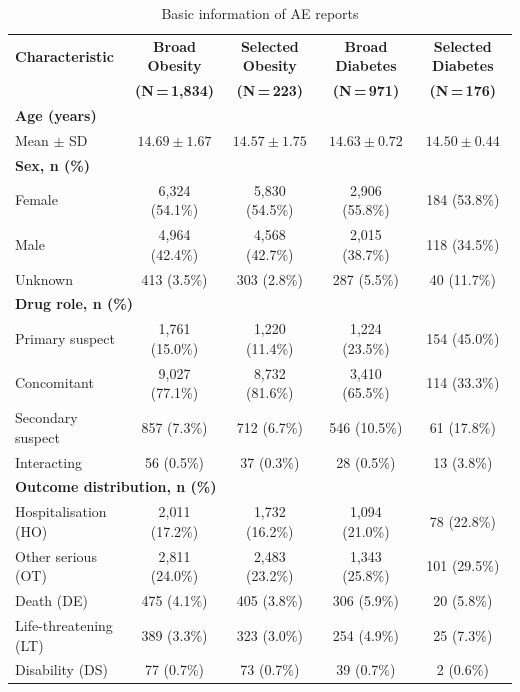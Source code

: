 \documentclass[10pt,a4paper]{article}
\begin{document}
\begin{table}[htbp]
\caption{Basic information of AE reports}
\label{tab:demographics}

\centering\footnotesize\setlength{\tabcolsep}{3.5pt}
\begin{tabular}{|l|c|c|c|c|}
\hline
\textbf{Characteristic} & \textbf{Broad Obesity} & \textbf{Selected Obesity} & \textbf{Broad Diabetes} & \textbf{Selected Diabetes} \\
 & \textbf{(N\,=\,1,834)} & \textbf{(N\,=\,223)} & \textbf{(N\,=\,971)} & \textbf{(N\,=\,176)} \\
\hline
\multicolumn{5}{|l|}{\textbf{Age (years)}} \\
\hline
\quad Mean $\pm$ SD & $14.69 \pm 1.67$ & $14.57 \pm 1.75$ & $14.63 \pm 0.72$ & $14.50 \pm 0.44$ \\
\hline
\multicolumn{5}{|l|}{\textbf{Sex, n (\%)}} \\
\hline
\quad Female & 6,324 (54.1\%) & 5,830 (54.5\%) & 2,906 (55.8\%) & 184 (53.8\%) \\
\quad Male & 4,964 (42.4\%) & 4,568 (42.7\%) & 2,015 (38.7\%) & 118 (34.5\%) \\
\quad Unknown & 413 (3.5\%) & 303 (2.8\%) & 287 (5.5\%) & 40 (11.7\%) \\
\hline
\multicolumn{5}{|l|}{\textbf{Drug role, n (\%)}} \\
\hline
\quad Primary suspect & 1,761 (15.0\%) & 1,220 (11.4\%) & 1,224 (23.5\%) & 154 (45.0\%) \\
\quad Concomitant & 9,027 (77.1\%) & 8,732 (81.6\%) & 3,410 (65.5\%) & 114 (33.3\%) \\
\quad Secondary suspect & 857 (7.3\%) & 712 (6.7\%) & 546 (10.5\%) & 61 (17.8\%) \\
\quad Interacting & 56 (0.5\%) & 37 (0.3\%) & 28 (0.5\%) & 13 (3.8\%) \\
\hline
\multicolumn{5}{|l|}{\textbf{Outcome distribution, n (\%)}} \\
\hline
\quad Hospitalisation (HO) & 2,011 (17.2\%) & 1,732 (16.2\%) & 1,094 (21.0\%) & 78 (22.8\%) \\
\quad Other serious (OT) & 2,811 (24.0\%) & 2,483 (23.2\%) & 1,343 (25.8\%) & 101 (29.5\%) \\
\quad Death (DE) & 475 (4.1\%) & 405 (3.8\%) & 306 (5.9\%) & 20 (5.8\%) \\
\quad Life-threatening (LT) & 389 (3.3\%) & 323 (3.0\%) & 254 (4.9\%) & 25 (7.3\%) \\
\quad Disability (DS) & 77 (0.7\%) & 73 (0.7\%) & 39 (0.7\%) & 2 (0.6\%) \\

\end{tabular}
\end{table}
\end{document}
